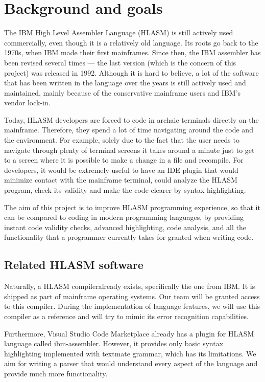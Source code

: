 \chapter{Background and goals}


The IBM High Level Assembler Language (HLASM) is still actively used commercially, even though it is a relatively old language. Its roots go back to the 1970s, when IBM made their first mainframes. Since then, the IBM assembler has been revised several times --- the last version (which is the concern of this project) was released in 1992. Although it is hard to believe, a lot of the software that has been written in the language over the years is still actively used and maintained, mainly because of the conservative mainframe users and IBM's vendor lock-in.

Today, HLASM developers are forced to code in archaic terminals directly on the mainframe. Therefore, they spend a lot of time navigating around the code and the environment. For example, solely due to the fact that the user needs to navigate through plenty of terminal screens it takes around a minute just to get to a screen where it is possible to make a change in a file and recompile. For developers, it would be extremely useful to have an IDE plugin that would minimize contact with the mainframe terminal, could analyze the HLASM program, check its validity and make the code clearer by syntax highlighting. 

The aim of this project is to improve HLASM programming experience, so that it can be compared to coding in modern programming languages, by providing instant code validity checks, advanced highlighting, code analysis, and all the functionality that a programmer currently takes for granted when writing code.

\section{Related HLASM software}
Naturally, a HLASM compiler\footnotemark already exists, specifically the one from IBM. It is shipped as part of mainframe operating systems. Our team will be granted access to this compiler. During the implementation of language features, we will use this compiler as a reference and will try to mimic its error recognition capabilities.

Furthermore, Visual Studio Code Marketplace already has a plugin for HLASM language called ibm\nobreakdash-assembler\footnotemark. However, it provides only basic syntax highlighting implemented with textmate grammar, which has its limitations. We aim for writing a parser that would understand every aspect of the language and provide much more functionality.
